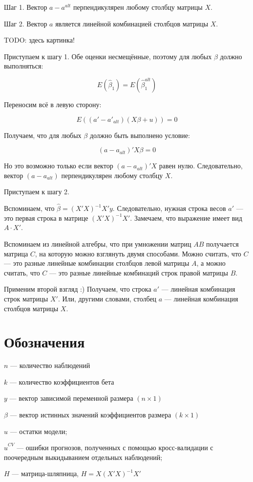 \documentclass[11pt,russian,]{book}
\begin{document}
Шаг 1. Вектор \(a - a^{alt}\) перпендикулярен любому столбцу матрицы \(X\).

Шаг 2. Вектор \(a\) является линейной комбинацией столбцов матрицы \(X\).

TODO: здесь картинка!

Приступаем к шагу 1. Обе оценки несмещённые, поэтому для любых \(\beta\) должно выполняться:

\[
E(\hat\beta_1) = E(\hat\beta_1^{alt})
\]

Переносим всё в левую сторону:

\[
E((a' - a'_{alt})(X\beta + u)) = 0
\]

Получаем, что для любых \(\beta\) должно быть выполнено условие:

\[
(a - a_{alt})'X\beta = 0
\]

Но это возможно только если вектор \((a - a_{alt})'X\) равен нулю.
Следовательно, вектор \((a - a_{alt})\) перпендикулярен любому столбцу \(X\).

Приступаем к шагу 2.

Вспоминаем, что \(\hat \beta = (X'X)^{-1}X'y\). Следовательно, нужная строка весов \(a'\) ---
это первая строка в матрице \((X'X)^{-1}X'\).
Замечаем, что выражение имеет вид \(A \cdot X'\).

Вспоминаем из линейной алгебры, что при умножении матриц \(AB\) получается матрица \(C\),
на которую можно взглянуть двумя способами.
Можно считать, что \(C\) --- это разные линейные комбинации столбцов левой матрицы \(A\),
а можно считать, что \(C\) --- это разные линейные комбинаций строк правой матрицы \(B\).

Применим второй взгляд :) Получаем, что строка \(a'\) --- линейная комбинация строк матрицы \(X'\).
Или, другими словами, столбец \(a\) --- линейная комбинация столбцов матрицы \(X\).

\hypertarget{notation}{%
\chapter{Обозначения}\label{notation}}

\(n\) --- количество наблюдений

\(k\) --- количество коэффициентов бета

\(y\) --- вектор зависимой переменной размера \((n\times 1)\)

\(\beta\) --- вектор истинных значений коэффициентов размера \((k \times 1)\)

\(\hat u\) --- остатки модели;

\(\hat u^{CV}\) --- ошибки прогнозов, полученных с помощью кросс-валидации с поочередным выкидыванием отдельных наблюдений;

\(H\) --- матрица-шляпница, \(H = X(X'X)^{-1}X'\)


\end{document}
